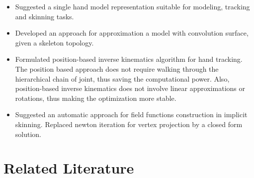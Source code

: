 \documentclass[10pt,journal,a4paper]{IEEEtran}
\begin{document}
\begin{itemize}

\item Suggested a single hand model representation suitable for modeling, tracking and skinning tasks. 
\item Developed an approach for approximation a model with convolution surface, given a skeleton topology.
\item Formulated position-based inverse kinematics algorithm for hand tracking. The position based approach does not require walking through the hierarchical chain of joint, thus saving the computational power. Also, position-based inverse kinematics does not involve linear approximations or rotations, thus making the optimization more stable.
\item Suggested an automatic approach for field functions construction in implicit skinning.  \textcolor{mygray}{Replaced newton iteration for vertex projection by a closed form solution.}

\end{itemize}



\section{Related Literature}
\end{document}
